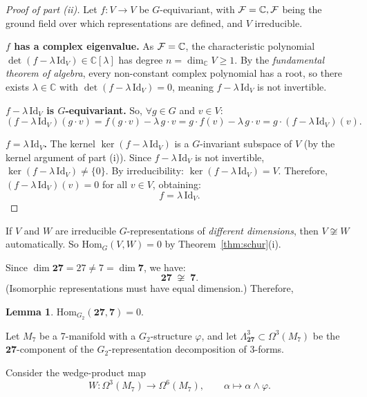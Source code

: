 \documentclass[a4paper,11pt,fleqn]{article}
\theoremstyle{plain}
\newtheorem{lemma}[theorem]{Lemma}
\theoremstyle{definition}
\newcommand{\HomG}{\mathrm{Hom}_{G_2}}
\begin{document}
\begin{proof}[Proof of part (ii)]
Let $f:V\to V$ be $G$-equivariant, with ${\cal F}=\mathbb{C}, {\cal F}$ being the ground field over which representations are defined, and $V$ irreducible.

\medskip
\noindent
{\bf $f$ has a complex eigenvalue.}
As ${\cal F}=\mathbb{C}$, the characteristic polynomial $\det(f-\lambda\,\mathrm{Id}_V)\in\mathbb{C}[\lambda]$
has degree $n=\dim_\mathbb{C} V\geq 1$. By the \emph{fundamental theorem of algebra}, every non-constant complex polynomial
has a root, so there exists $\lambda\in\mathbb{C}$ with $\det(f-\lambda\,\mathrm{Id}_V)=0$, meaning $f-\lambda\,\mathrm{Id}_V$ is not invertible.

\medskip
\noindent
{\bf $f-\lambda\,\mathrm{Id}_V$ is $G$-equivariant.}
So, $\forall g\in G$ and $v\in V$:
\[
  (f-\lambda\,\mathrm{Id}_V)(g\cdot v)
  = f(g\cdot v) - \lambda\,g\cdot v
  = g\cdot f(v) - \lambda\,g\cdot v
  = g\cdot(f-\lambda\,\mathrm{Id}_V)(v).
\]

\medskip
\noindent
{\bf $f=\lambda\,\mathrm{Id}_V$.}
The kernel $\ker(f-\lambda\,\mathrm{Id}_V)$ is a $G$-invariant subspace of $V$ 
(by the kernel argument of part (i)). Since $f-\lambda\,\mathrm{Id}_V$ is not invertible, $\ker(f-\lambda\,\mathrm{Id}_V)\neq\{0\}$.
By irreducibility: $\ker(f-\lambda\,\mathrm{Id}_V)=V$. Therefore, $(f-\lambda\,\mathrm{Id}_V)(v)=0$ for all $v\in V$, obtaining:
\[
  \boxed{f = \lambda\,\mathrm{Id}_V.}
\]



\end{proof}

If $V$ and $W$ are irreducible $G$-representations of \emph{different dimensions},
then $V\not\cong W$ automatically. So $\mathrm{Hom}_G(V,W)=0$ by Theorem~\ref{thm:schur}(i).

Since $\dim\mathbf{27} = 27 \neq 7 = \dim\mathbf{7}$, we have:
\[
  \mathbf{27} \;\not\cong\; \mathbf{7}.
\]
(Isomorphic representations must have equal dimension.) Therefore, 
\begin{lemma}
\label{HomG22770}
$\HomG(\mathbf{27},\mathbf{7}) = 0.$
\end{lemma}

Let $M_7$ be a 7-manifold with a $G_2$-structure $\varphi$, and let
$\Lambda^3_{\mathbf{27}}\subset\Omega^3(M_7)$ be the $\mathbf{27}$-component
of the $G_2$-representation decomposition of 3-forms.

Consider the wedge-product map
\[
  W:\Omega^3(M_7)\longrightarrow\Omega^6(M_7),
  \qquad
  \alpha\longmapsto\alpha\wedge\varphi.
\]
\end{document}
